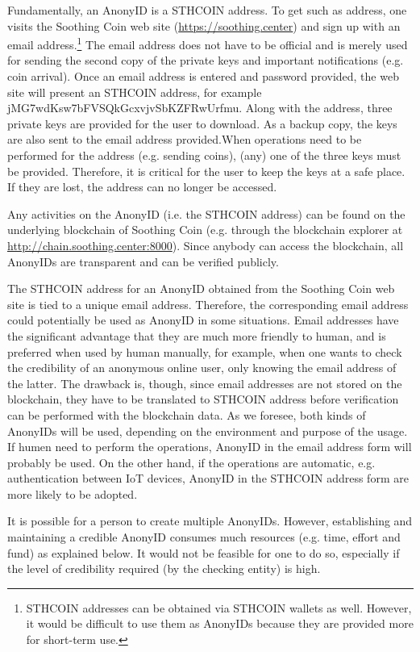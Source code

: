 \documentclass[12pt, a4paper]{article}
\begin{document}
Fundamentally, an AnonyID is a STHCOIN address. To get such as address, one visits the Soothing Coin web site (\href{https://soothing.center}{https://soothing.center}) and sign up with an email address.\footnote{STHCOIN addresses can be obtained via STHCOIN wallets as well. However, it would be difficult to use them as AnonyIDs because they are provided more for short-term use.} The email address does not have to be official and is merely used for sending the second copy of the private keys and important notifications (e.g. coin arrival). Once an email address is entered and password provided, the web site will present an STHCOIN address, for example jMG7wdKsw7bFVSQkGcxvjvSbKZFRwUrfmu. Along with the address, three private keys are provided for the user to download. As a backup copy, the keys are also sent to the email address provided.When operations need to be performed for the address (e.g. sending coins), (any) one of the three keys must be provided. Therefore, it is critical for the user to keep the keys at a safe place. If they are lost, the address can no longer be accessed. 

Any activities on the AnonyID (i.e. the STHCOIN address) can be found on the underlying blockchain of Soothing Coin (e.g. through the blockchain explorer at \href{http://chain.soothing.center:8000}{http://chain.soothing.center:8000}). Since anybody can access the blockchain, all AnonyIDs are transparent and can be verified publicly.

The STHCOIN address for an AnonyID obtained from the Soothing Coin web site is tied to a unique email address. Therefore, the corresponding email address could potentially be used as AnonyID in some situations. Email addresses have the significant advantage that they are much more friendly to human, and is preferred when used by human manually, for example, when one wants to check the credibility of an anonymous online user, only knowing the email address of the latter. The drawback is, though, since email addresses are not stored on the blockchain, they have to be translated to STHCOIN address before verification can be performed with the blockchain data. As we foresee, both kinds of AnonyIDs will be used, depending on the environment and purpose of the usage. If humen need to perform the operations, AnonyID in the email address form will probably be used. On the other hand, if the operations are automatic, e.g. authentication between IoT devices, AnonyID in the STHCOIN address form are more likely to be adopted.

It is possible for a person to create multiple AnonyIDs. However, establishing and maintaining a credible AnonyID consumes much resources (e.g. time, effort and fund) as explained below. It would not be feasible for one to do so, especially if the level of credibility required (by the checking entity) is high.
\end{document}
